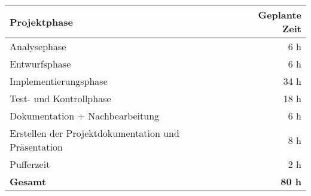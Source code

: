 \begin{tabular}{lr}
    \hline
        \textbf{Projektphase} & \textbf{Geplante Zeit} \\ 
        \hline
        Analysephase & 6 h \\ 
        \hline
        Entwurfsphase & 6 h \\ 
        \hline
        Implementierungsphase & 34 h \\ 
        \hline
        Test- und Kontrollphase & 18 h \\ 
        \hline
        Dokumentation + Nachbearbeitung & 6 h \\ 
        \hline
        Erstellen der Projektdokumentation und Präsentation & 8 h \\ 
        \hline
        Pufferzeit & 2 h \\ 
        \hline
        \textbf{Gesamt} & \textbf{80 h} \\ 
        \hline
\end{tabular}
    
